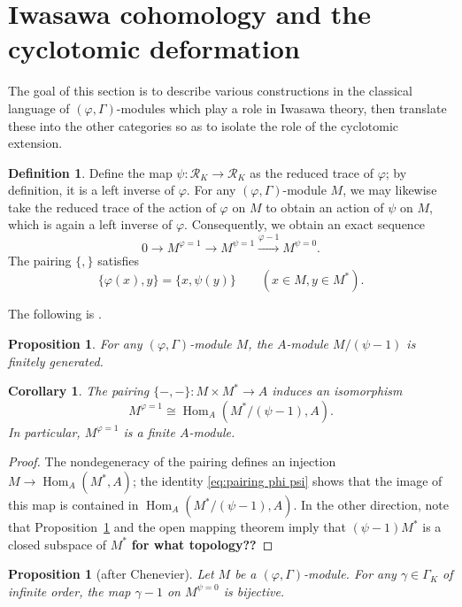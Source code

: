 \documentclass[12pt]{amsart}
\newtheorem{cor}[theorem]{Corollary}
\newtheorem{prop}[theorem]{Proposition}
\theoremstyle{definition}
\newtheorem{defn}[theorem]{Definition}
\numberwithin{equation}{theorem}
\newcommand{\calR}{\mathcal{R}}
\DeclareMathOperator{\Hom}{Hom}
\begin{document}
\section{Iwasawa cohomology and the cyclotomic deformation}

The goal of this section is to describe various constructions in the classical language of $(\varphi, \Gamma)$-modules which play a role in Iwasawa theory, then translate these into the other categories so as to isolate the role of the cyclotomic extension.

\begin{defn}
Define the map $\psi: \calR_K \to \calR_K$ as the reduced trace of $\varphi$; by definition, it is a left inverse of $\varphi$. For any $(\varphi, \Gamma)$-module $M$,
we may likewise take the reduced trace of the action of $\varphi$ on $M$ to obtain an action of $\psi$ on $M$, which is again a left inverse of $\varphi$. Consequently, we obtain an exact sequence
\begin{equation} \label{eq:psi sequence}
0 \to M^{\varphi=1} \to M^{\psi=1} \stackrel{\varphi-1}{\longrightarrow} M^{\psi=0}.
\end{equation}
The pairing $\{, \}$ satisfies
\begin{equation} \label{eq:pairing phi psi}
\{\varphi(x), y\} = \{x, \psi(y)\} \qquad (x \in M, y \in M^*).
\end{equation}
\end{defn}

The following is \cite[Proposition~3.3.2(1)]{kpx}.
\begin{prop} \label{P:psi finite}
For any $(\varphi, \Gamma)$-module $M$,
the $A$-module $M/(\psi-1)$ is finitely generated.
\end{prop}
\begin{cor}
The pairing $\{-,-\}: M \times M^* \to A$ induces an isomorphism
\[
M^{\varphi=1} \cong \Hom_A(M^*/(\psi-1), A).
\]
In particular, $M^{\varphi=1}$ is a finite $A$-module.
\end{cor}
\begin{proof}
The nondegeneracy of the pairing defines an injection $M \to \Hom_A(M^*, A)$;
the identity \eqref{eq:pairing phi psi} shows that the image of this map is contained in
$\Hom_A(M^*/(\psi-1), A)$. In the other direction, note that Proposition~\ref{P:psi finite} and the open mapping theorem imply that $(\psi-1)M^*$ is a closed subspace of $M^*$
\textbf{for what topology??}
\end{proof}

\begin{prop}[after Chenevier]
Let $M$ be a $(\varphi, \Gamma)$-module.
For any $\gamma \in \Gamma_K$ of infinite order, the map $\gamma-1$ on $M^{\psi=0}$ is bijective.
\end{prop}
\end{document}
